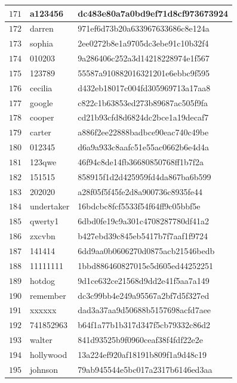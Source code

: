 \begin{longtable}{|l|l|l|}
    $171$ & a123456 & dc483e80a7a0bd9ef71d8cf973673924 \\ \hline
    $172$ & darren & 971ef6d73b20a633967633686c8e124a \\ \hline
    $173$ & sophia & 2ee0272b8e1a9705dc3ebe91c10b32f4 \\ \hline
    $174$ & 010203 & 9a286406c252a3d14218228974e1f567 \\ \hline
    $175$ & 123789 & 55587a910882016321201e6ebbc9f595 \\ \hline
    $176$ & cecilia & d432eb18017c004fd305969713a17aa8 \\ \hline
    $177$ & google & c822c1b63853ed273b89687ac505f9fa \\ \hline
    $178$ & cooper & cd21b93cfd8d6824dc2bce1a19decaf7 \\ \hline
    $179$ & carter & a886f2ee22888badbce90eac740c49be \\ \hline
    $180$ & 012345 & d6a9a933c8aafc51e55ac0662b6e4d4a \\ \hline
    $181$ & 123qwe & 46f94c8de14fb36680850768ff1b7f2a \\ \hline
    $182$ & 151515 & 858915f1d2d425959fd4da867ba6b599 \\ \hline
    $183$ & 202020 & a28f05f5f45fe2d8a900736c8935fe44 \\ \hline
    $184$ & undertaker & 16bdcbc8fcf5533f54f64ff9c05bbf5e \\ \hline
    $185$ & qwerty1 & 6dbd0fe19c9a301c4708287780df41a2 \\ \hline
    $186$ & zxcvbn & b427ebd39c845eb5417b7f7aaf1f9724 \\ \hline
    $187$ & 141414 & 6dd9aa0b0606270d0875acb21546bedb \\ \hline
    $188$ & 11111111 & 1bbd886460827015e5d605ed44252251 \\ \hline
    $189$ & hotdog & 9d1ce632ce21568d9dd2e41f5aa7a149 \\ \hline
    $190$ & remember & dc3c99bb4e249a95567a2bf7d5f327ed \\ \hline
    $191$ & xxxxxx & dad3a37aa9d50688b5157698acfd7aee \\ \hline
    $192$ & 741852963 & b64f1a77b1b317d347f5cb79332c86d2 \\ \hline
    $193$ & walter & 841d93525b9f0960ceaf38f4fdf22e2e \\ \hline
    $194$ & hollywood & 13a224ef920af18191b809f1a9d48c19 \\ \hline
    $195$ & johnson & 79ab945544e5bc017a2317b6146ed3aa \\ \hline

\end{longtable}
